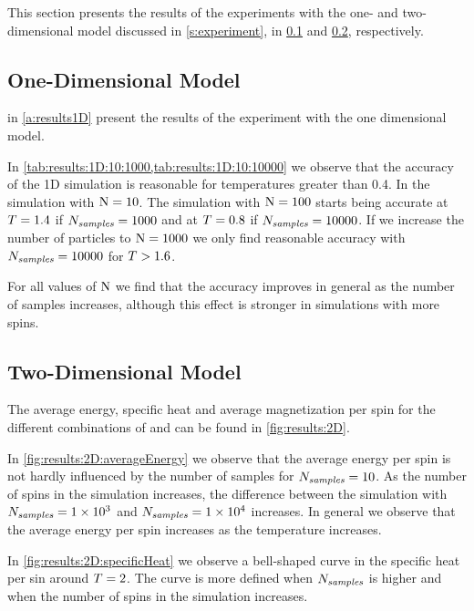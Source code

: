 This section presents the results of the experiments with the one- and two- dimensional model discussed in \cref{s:experiment}, in \cref{ss:results:1D} and \cref{ss:results:2D}, respectively.

\subsection{One-Dimensional Model}
\label{ss:results:1D}
	 in \cref{a:results1D} present the results of the experiment with the one dimensional model.

	In \cref{tab:results:1D:10:1000,tab:results:1D:10:10000} we observe that the accuracy of the 1D simulation is reasonable for temperatures greater than 0.4. In the simulation with $\mathrm{N} = 10$. 
	The simulation with $\mathrm{N} = 100$ starts being accurate at $T = 1.4$ if $N_\textit{samples} = 1000$ and at $T = 0.8$ if $N_\textit{samples} = 10000$. 
	If we increase the number of particles to $\mathrm{N} = 1000$ we only find reasonable accuracy with $N_\textit{samples} = 10000$ for $T > 1.6$.

	For all values of $\mathrm{N}$ we find that the accuracy improves in general as the number of samples increases, although this effect is stronger in simulations with more spins.

\subsection{Two-Dimensional Model}
\label{ss:results:2D}
	The average energy, specific heat and average magnetization per spin for the different combinations of \numberOfSpins and \numberOfSamples can be found in \cref{fig:results:2D}. 

	In \cref{fig:results:2D:averageEnergy} we observe that the average energy per spin is not hardly influenced by the number of samples for $N_\textit{samples} = 10$. As the number of spins in the simulation increases, the difference between the simulation with $N_\textit{samples} = \num{1.e+3}$ and $N_\textit{samples} = \num{1.e+4}$ increases. In general we observe that the average energy per spin increases as the temperature increases.

	In \cref{fig:results:2D:specificHeat} we observe a bell-shaped curve in the specific heat per sin around $T = 2$. The curve is more defined when $N_\textit{samples}$ is higher and when the number of spins in the simulation increases.

